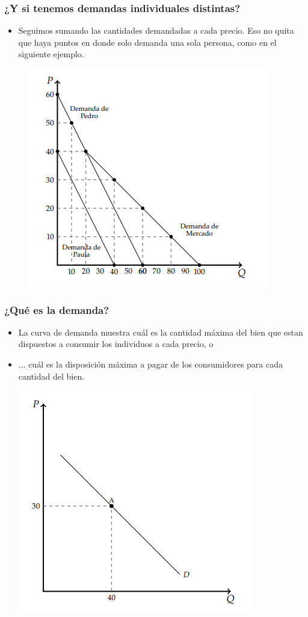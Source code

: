 \documentclass{beamer}
\begin{document}
\begin{frame}
  \frametitle{¿Y si tenemos demandas individuales distintas?}
  \begin{itemize}
    \item Seguimos sumando las cantidades demandadas a cada precio. Eso no quita que haya puntos en donde solo demanda una sola persona, como en el siguiente ejemplo.
  \end{itemize}
  \begin{figure}[H]
    \centering
    \includegraphics[scale=0.8]{../Figures/C10.3.png}       
  \end{figure}
\end{frame}

  
\begin{frame}
  \frametitle{¿Qué es la demanda?}
  \begin{itemize}
    \item La curva de demanda muestra cuál es la cantidad máxima del bien que estan dispuestos a consumir los individuos a cada precio, o \vspace{2mm}
    \item ...  cuál es la disposición máxima a pagar de los consumidores para cada cantidad del bien.
    
    \centering
    \includegraphics[scale=0.7]{../Figures/C10.4.png}
  \end{itemize}
\end{frame}
\end{document}
